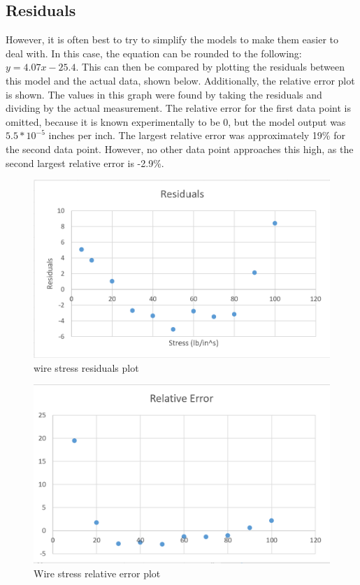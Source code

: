 \documentclass[12pt]{extarticle}
\begin{document}
\subsection{Residuals}
However, it is often best to try to simplify the models to make them easier to deal with. In this case, the equation can be rounded to the following: $y = 4.07x - 25.4$. This can then be compared by plotting the residuals between this model and the actual data, shown below. Additionally, the relative error plot is shown. The values in this graph were found by taking the residuals and dividing by the actual measurement. The relative error for the first data point is omitted, because it is known experimentally to be 0, but the model output was $5.5*10^{-5}$ inches per inch. The largest relative error was approximately 19\% for the second data point. However, no other data point approaches this high, as the second largest relative error is -2.9\%. 
\begin{figure}[ht!]
  \includegraphics[width=\linewidth]{ElongationResiduals.PNG}
  \caption{wire stress residuals plot}
\end{figure}
\begin{figure}
  \includegraphics[width=\linewidth]{ElongationRelativeError.PNG}
  \caption{Wire stress relative error plot}
\end{figure}
\newpage
\end{document}
